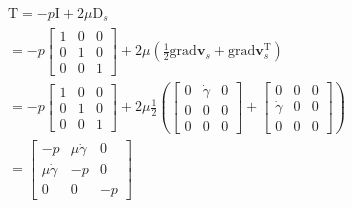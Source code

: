 \begin{problem}
\begin{enumerate}
\begin{align}
\text{T}=-p\text{I}+2\mu \text{D}_{s} \\
=-p\begin{bmatrix}
1 & 0 & 0 \\
0 & 1 & 0 \\
0 & 0 & 1
\end{bmatrix}+2\mu\left( \frac{1}{2} \text{grad}\mathbf{v}_{s}+\text{grad}\mathbf{v}_{s}^{\text{T}} \right) \\
=-p\begin{bmatrix}
1 & 0 & 0 \\
0 & 1 & 0 \\
0 & 0 & 1
\end{bmatrix}+2\mu\frac{1}{2}\left(\begin{bmatrix}
0 & \dot{\gamma} & 0 \\
0 & 0 & 0 \\
0 & 0 & 0
\end{bmatrix}+\begin{bmatrix}
0 & 0 & 0 \\
\dot{\gamma} & 0 & 0 \\
0 & 0 & 0
\end{bmatrix}\right) \\
= \begin{bmatrix}
-p & \mu \dot{\gamma} & 0 \\
\mu \dot{\gamma} & -p &0 \\
0 & 0 & -p
\end{bmatrix}
\end{align}



        \end{enumerate}
        
   


 
\end{problem}
